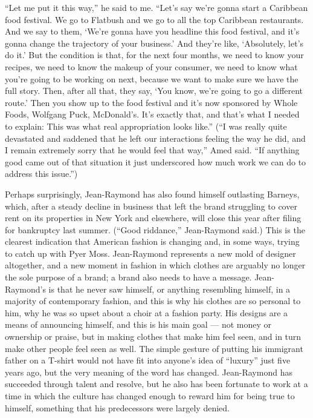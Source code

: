``Let me put it this way,'' he said to me. ``Let's say we're gonna start
a Caribbean food festival. We go to Flatbush and we go to all the top
Caribbean restaurants. And we say to them, `We're gonna have you
headline this food festival, and it's gonna change the trajectory of
your business.' And they're like, `Absolutely, let's do it.' But the
condition is that, for the next four months, we need to know your
recipes, we need to know the makeup of your consumer, we need to know
what you're going to be working on next, because we want to make sure we
have the full story. Then, after all that, they say, `You know, we're
going to go a different route.' Then you show up to the food festival
and it's now sponsored by Whole Foods, Wolfgang Puck, McDonald's. It's
exactly that, and that's what I needed to explain: This was what real
appropriation looks like.'' (``I was really quite devastated and
saddened that he left our interactions feeling the way he did, and I
remain extremely sorry that he would feel that way,'' Amed said. ``If
anything good came out of that situation it just underscored how much
work we can do to address this issue.'')

Perhaps surprisingly, Jean-Raymond has also found himself outlasting
Barneys, which, after a steady decline in business that left the brand
struggling to cover rent on its properties in New York and elsewhere,
will close this year after filing for bankruptcy last summer. (``Good
riddance,'' Jean-Raymond said.) This is the clearest indication that
American fashion is changing and, in some ways, trying to catch up with
Pyer Moss. Jean-Raymond represents a new mold of designer altogether,
and a new moment in fashion in which clothes are arguably no longer the
sole purpose of a brand; a brand also needs to have a message.
Jean-Raymond's is that he never saw himself, or anything resembling
himself, in a majority of contemporary fashion, and this is why his
clothes are so personal to him, why he was so upset about a choir at a
fashion party. His designs are a means of announcing himself, and this
is his main goal --- not money or ownership or praise, but in making
clothes that make him feel seen, and in turn make other people feel seen
as well. The simple gesture of putting his immigrant father on a T-shirt
would not have fit into anyone's idea of ``luxury'' just five years ago,
but the very meaning of the word has changed. Jean-Raymond has succeeded
through talent and resolve, but he also has been fortunate to work at a
time in which the culture has changed enough to reward him for being
true to himself, something that his predecessors were largely denied.

